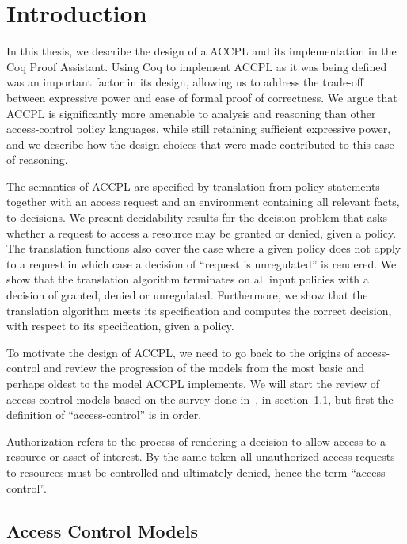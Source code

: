 \chapter{Introduction}

In this thesis, we describe the design of a \ac{ACCPL} and its implementation in the Coq Proof Assistant. Using Coq to implement \ac{ACCPL} as it was being defined was an important factor in its design, allowing us to address the trade-off between expressive power and ease of formal proof of correctness. We argue that \ac{ACCPL} is significantly more amenable to analysis and reasoning than other access-control policy languages, while still retaining sufficient expressive power, and we describe how the design choices that were made contributed to this ease of reasoning. 

The semantics of \ac{ACCPL} are specified by translation from policy statements together with an access request and an environment containing all relevant facts, to decisions. We present decidability results for the decision problem that asks whether a request to access a resource may be granted or denied, given a policy. The translation functions also cover the case where a given policy does not apply to a request in which case a decision of ``request is unregulated'' is rendered. We show that the translation algorithm terminates on all input policies with a decision of granted, denied or unregulated. Furthermore, we show that the translation algorithm meets its specification and computes the correct decision, with respect to its specification, given a policy. 

To motivate the design of \ac{ACCPL}, we need to go back to the origins of access-control and review the progression of the models from the most basic and perhaps oldest to the model \ac{ACCPL} implements. We will start the review of access-control models based on the survey done in~\cite{nist}, in section~\ref{sec:models}, but first the definition of ``access-control'' is in order.

Authorization refers to the process of rendering a decision to allow access to a resource or asset of interest. By the same token all unauthorized access requests to resources must be controlled and ultimately denied, hence the term ``access-control''. 


\section{Access Control Models}\label{sec:models}


